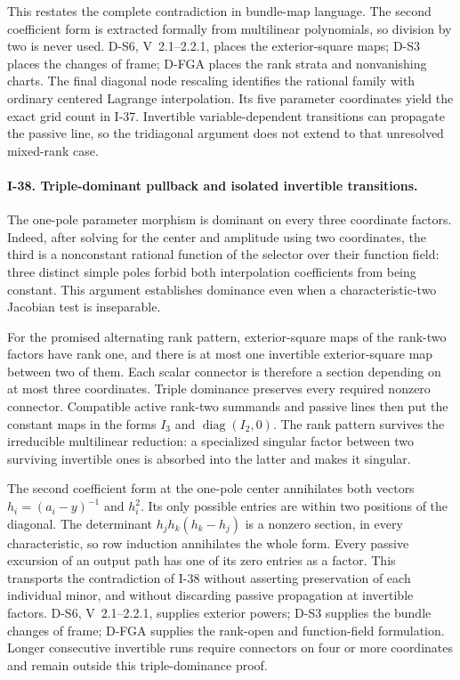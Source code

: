 This restates the complete contradiction in bundle-map language.
The second coefficient form is extracted formally from multilinear
polynomials, so division by two is never used. D-S6, V~2.1--2.2.1,
places the exterior-square maps; D-S3 places the changes of frame;
D-FGA places the rank strata and nonvanishing charts. The final
diagonal node rescaling identifies the rational family with
ordinary centered Lagrange interpolation. Its five parameter
coordinates yield the exact grid count in I-37. Invertible
variable-dependent transitions can propagate the passive line,
so the tridiagonal argument does not extend to that unresolved
mixed-rank case.


\paragraph{I-38. Triple-dominant pullback and isolated invertible transitions.}
The one-pole parameter morphism is dominant on every three
coordinate factors. Indeed, after solving for the center and
amplitude using two coordinates, the third is a nonconstant
rational function of the selector over their function field:
three distinct simple poles forbid both interpolation coefficients
from being constant. This argument establishes dominance even
when a characteristic-two Jacobian test is inseparable.

For the promised alternating rank pattern, exterior-square maps
of the rank-two factors have rank one, and there is at most one
invertible exterior-square map between two of them. Each scalar
connector is therefore a section depending on at most three
coordinates. Triple dominance preserves every required nonzero
connector. Compatible active rank-two summands and passive lines
then put the constant maps in the forms $I_3$ and
$\operatorname{diag}(I_2,0)$. The rank pattern survives the
irreducible multilinear reduction: a specialized singular factor
between two surviving invertible ones is absorbed into the latter
and makes it singular.

The second coefficient form at the one-pole center annihilates
both vectors $h_i=(a_i-y)^{-1}$ and $h_i^2$. Its only possible
entries are within two positions of the diagonal. The determinant
$h_jh_k(h_k-h_j)$ is a nonzero section, in every characteristic,
so row induction annihilates the whole form. Every passive
excursion of an output path has one of its zero entries as a
factor. This transports the contradiction of I-38 without
asserting preservation of each individual minor, and without
discarding passive propagation at invertible factors.
D-S6, V~2.1--2.2.1, supplies exterior powers; D-S3 supplies the
bundle changes of frame; D-FGA supplies the rank-open and
function-field formulation. Longer consecutive invertible runs
require connectors on four or more coordinates and remain outside
this triple-dominance proof.


